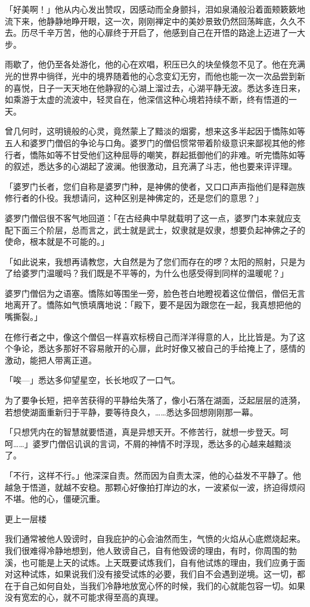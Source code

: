 \documentclass[12pt,twoside,openany]{book}
\begin{document}
「好美啊！」他从内心发出赞叹，因感动而全身颤抖，泪如泉涌般沿着面颊簌簌地流下来，他静静地睁开眼，这一次，刚刚禅定中的美妙景致仍然回荡眸底，久久不去。历尽千辛万苦，他的心扉终于开启了，他感到自己在开悟的路途上迈进了一大步。

雨歇了，他仍至各处游化，他的心在欢唱，积压已久的块垒倏忽不见了。他在充满光的世界中徜徉，光中的境界随着他的心念变幻无穷，而他也能一次一次品尝到新的喜悦，日子一天天地在他静寂的心湖上溜过去，心湖平静无波。悉达多连日来，如乘游于太虚的流波中，轻灵自在，他深信这种心境若持续不断，终有悟道的一天。

曾几何时，这明镜般的心灵，竟然蒙上了黯淡的烟雾，想来这多半起因于憍陈如等五人和婆罗门僧侣的争论与口角。婆罗门的僧侣惯常带着阶级意识来鄙视其他的修行者，憍陈如等不甘受他们这种屈辱的嘲笑，群起抵御他们的非难。听完憍陈如等的叙述，悉达多的心湖起了波澜。他很激动，且充满了斗志，他也要来评评理。

「婆罗门长者，您们自称是婆罗门种，是神佛的使者，又口口声声指他们是释迦族修行者的仆役。我想请问，这种区别是神佛定的，还是您们的意思？」

婆罗门僧侣很不客气地回道：「在古经典中早就载明了这一点，婆罗门本来就应支配下面三个阶层，总而言之，武士就是武士，奴隶就是奴隶，想要负起神佛之子的使命，根本就是不可能的。」

「如此说来，我想再请教您，大自然是为了您们而存在的啰？太阳的照射，只是为了给婆罗门温暖吗？我们既是不平等的，为什么也感受得到同样的温暖呢？」

婆罗门僧侣为之语塞。憍陈如等围坐一旁，脸色苍白地瞪视着这位僧侣，僧侣无言地离开了。憍陈如气愤填膺地说：「殿下，要不是因为跟您在一起，我真想把他的嘴撕裂。」

在修行者之中，像这个僧侣一样喜欢标榜自己而洋洋得意的人，比比皆是。为了这个争论，悉达多那好不容易敞开的心扉，此时好像又被自己的手给掩上了，感情的激动，能把人带离正道。

「唉---」悉达多仰望星空，长长地叹了一口气。

为了要争长短，把辛苦获得的平静给失落了，像小石落在湖面，泛起层层的涟漪，若想使湖面重新归于平静，要等待良久，……悉达多回想刚刚那一幕。

「只想凭内在的智慧就要悟道，真是异想天开。不修苦行，就想一步登天。呵呵……」婆罗门僧侣讥讽的言词，不屑的神情不时浮现，悉达多的心越来越黯淡了。

「不行，这样不行。」他深深自责。然而因为自责太深，他的心益发不平静了。他越急于悟道，就越不安稳。那颗心好像拍打岸边的水，一波紧似一波，挤迫得烦闷不堪。他的心，僵硬沉重。

更上一层楼

我们通常被他人毁谤时，自我庇护的心会油然而生，气愤的火焰从心底燃烧起来。我们很难得冷静地想到，他人致谤自己，自有他毁谤的理由，有时，你周围的勃溪，也可能是上天的试炼。上天既要试炼我们，自有他试炼的理由，我们应勇于面对这种试炼，如果说我们没有接受试炼的必要，我们自不会遇到逆境。这一切，都在于自己如何自处，当我们冷静地放宽心怀的时候，我们的心就能包容一切。如果没有宽宏的心，就不可能求得至高的真理。
\end{document}
